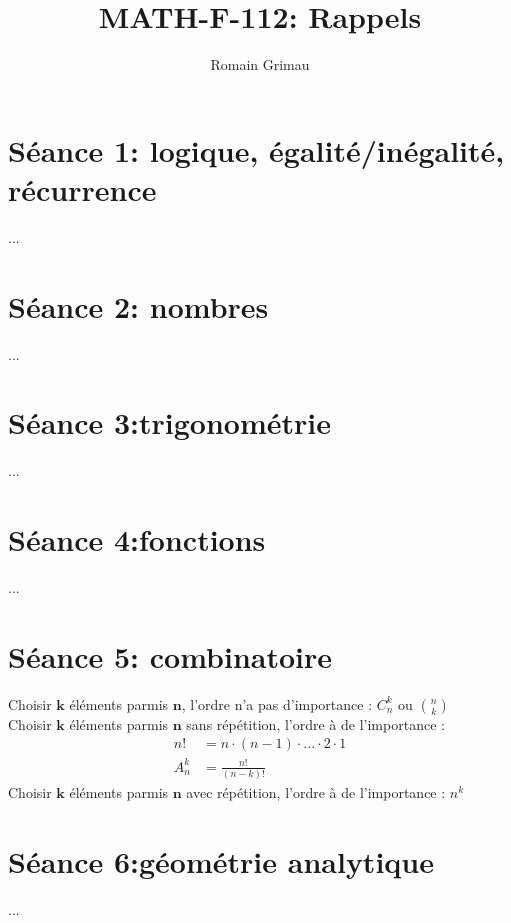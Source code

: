 \documentclass[12pt]{article}
\title{\textbf{MATH-F-112: Rappels}}
\author{Romain Grimau}
\date{}
\begin{document}
\maketitle

\section*{S\'eance 1: logique, \'egalit\'e/in\'egalit\'e, r\'ecurrence}
...
\section*{S\'eance 2: nombres}
...
\section*{S\'eance 3:trigonom\'etrie}
...
\section*{S\'eance 4:fonctions}
...
\section*{S\'eance 5: combinatoire}
Choisir $\textbf{k}$ \'el\'ements parmis $\textbf{n}$, l'ordre n'a pas d'importance : \(C_n^k\) ou \(\binom{n}{k}\) \\ \newline
\indent Choisir $\textbf{k}$ \'el\'ements parmis $\textbf{n}$ sans r\'ep\'etition, l'ordre \`a de l'importance :
\begin{align*}
    n! & =  n\cdot(n-1)\cdot ... \cdot2\cdot1 \\
    A_n^k & =  \frac{n!}{(n-k)!}
\end{align*}
\indent Choisir $\textbf{k}$ \'el\'ements parmis $\textbf{n}$ avec r\'ep\'etition, l'ordre \`a de l'importance : \(n^k\)
\section*{S\'eance 6:g\'eom\'etrie analytique}
...
\end{document}
